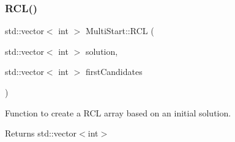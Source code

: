 \subsubsection{\texorpdfstring{R\+C\+L()}{RCL()}}
{\footnotesize\ttfamily std\+::vector$<$ int $>$ Multi\+Start\+::\+R\+CL (\begin{DoxyParamCaption}\item[{std\+::vector$<$ int $>$}]{solution,  }\item[{std\+::vector$<$ int $>$}]{first\+Candidates }\end{DoxyParamCaption})}



Function to create a R\+CL array based on an initial solution. 

\begin{DoxyReturn}{Returns}
std\+::vector$<$int$>$ 
\end{DoxyReturn}

